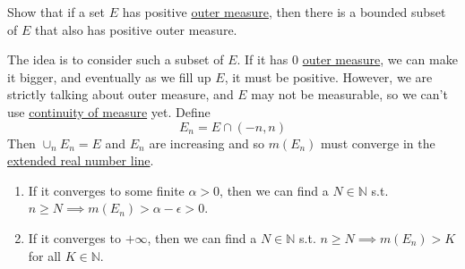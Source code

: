   \begin{exercise}[Royden 2.14]
    Show that if a set $E$ has positive \hyperref[def:outer-measure]{outer measure}, then there is a bounded subset of $E$ that also has positive outer measure.
  \end{exercise}
  \begin{solution}
    The idea is to consider such a subset of $E$. If it has $0$ \hyperref[def:outer-measure]{outer measure}, we can make it bigger, and eventually as we fill up $E$, it must be positive. However, we are strictly talking about outer measure, and $E$ may not be measurable, so we can't use \hyperref[thm:continuity-of-measure]{continuity of measure} yet. Define 
    \begin{equation}
      E_n = E \cap (-n, n)
    \end{equation}
    Then $\cup_n E_n = E$ and $E_n$ are increasing and so $m(E_n)$ must converge in the \hyperref[real-def:extended-real-number-line-2]{extended real number line}. 
    \begin{enumerate}
      \item If it converges to some finite $\alpha > 0$, then we can find a $N \in \mathbb{N}$ s.t. $n \geq N \implies m(E_n) > \alpha - \epsilon > 0$.  
      \item If it converges to $+\infty$, then we can find a $N \in \mathbb{N}$ s.t. $n \geq N \implies m(E_n) > K$ for all $K \in \mathbb{N}$. 
    \end{enumerate}
  \end{solution}

